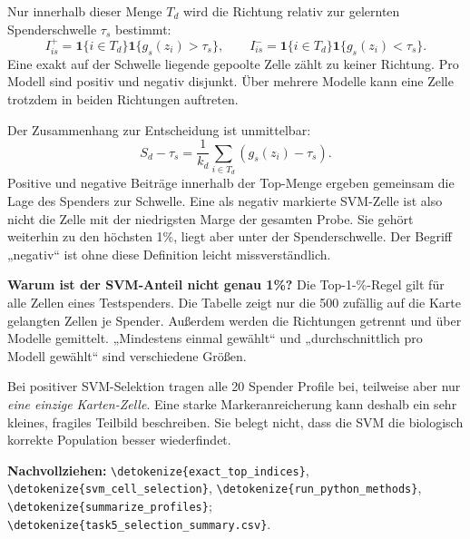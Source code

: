 \documentclass[11pt,a4paper]{article}
\newcommand{\code}[1]{\expandafter\nolinkurl\expandafter{\detokenize{#1}}}
\newcommand{\source}[1]{\par{\footnotesize\raggedright\color{muted}\textbf{Nachvollziehen:} #1\par}}
\newcommand{\tab}[4]{\begin{table}[!ht]\centering\caption{#2}\label{#3}{\small}#4\end{table}}
\begin{document}
Nur innerhalb dieser Menge \(T_d\) wird die Richtung relativ zur
gelernten Spenderschwelle \(\tau_s\) bestimmt:
\[
 I_{is}^+=\mathbf1\{i\in T_d\}\mathbf1\{g_s(z_i)>\tau_s\},\qquad
 I_{is}^-=\mathbf1\{i\in T_d\}\mathbf1\{g_s(z_i)<\tau_s\}.
\]
Eine exakt auf der Schwelle liegende gepoolte Zelle zählt zu keiner
Richtung. Pro Modell sind positiv und negativ disjunkt. Über mehrere
Modelle kann eine Zelle trotzdem in beiden Richtungen auftreten.

Der Zusammenhang zur Entscheidung ist unmittelbar:
\[
 S_d-\tau_s=\frac1{k_d}\sum_{i\in T_d}(g_s(z_i)-\tau_s).
\]
Positive und negative Beiträge innerhalb der Top-Menge ergeben gemeinsam
die Lage des Spenders zur Schwelle. Eine als negativ markierte SVM-Zelle
ist also nicht die Zelle mit der niedrigsten Marge der gesamten Probe.
Sie gehört weiterhin zu den höchsten 1\%, liegt aber unter der
Spenderschwelle. Der Begriff „negativ“ ist ohne diese Definition leicht
missverständlich.

\tab{selektion}{Auswahl auf den 10.000 Karten-Zellen. „Zellen“ zählt pro
Methode und Richtung die mindestens einmal gewählten Zellen. „Mittl. Anteil“
ist dagegen die mittlere Auswahlhäufigkeit innerhalb eines Spenders,
anschließend über Spender gemittelt. Min.–Max. zählt mindestens einmal
gewählte Karten-Zellen pro Spender.}{tab:selektion}{}

\textbf{Warum ist der SVM-Anteil nicht genau 1\%?} Die Top-1-\%-Regel gilt
für alle Zellen eines Testspenders. Die Tabelle zeigt nur die 500 zufällig
auf die Karte gelangten Zellen je Spender. Außerdem werden die Richtungen
getrennt und über Modelle gemittelt. „Mindestens einmal gewählt“ und
„durchschnittlich pro Modell gewählt“ sind verschiedene Größen.

Bei positiver SVM-Selektion tragen alle 20 Spender Profile bei, teilweise
aber nur \emph{eine einzige Karten-Zelle}. Eine starke Markeranreicherung
kann deshalb ein sehr kleines, fragiles Teilbild beschreiben. Sie belegt
nicht, dass die SVM die biologisch korrekte Population besser wiederfindet.
\source{\code{exact_top_indices}, \code{svm_cell_selection},
\code{run_python_methods}, \code{summarize_profiles};
\code{task5_selection_summary.csv}.}

\clearpage
\end{document}
